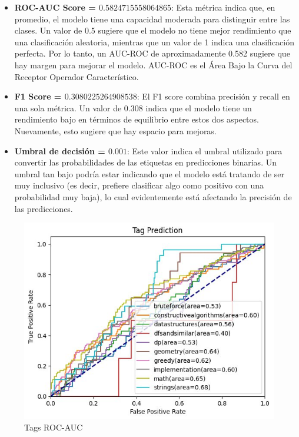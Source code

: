 \documentclass{article}
\begin{document}
    \begin{itemize}
        \item \textbf{ROC-AUC Score = $0.5824715558064865$}: Esta métrica indica que, en promedio, el modelo tiene una 
        capacidad moderada para distinguir entre las clases. Un valor de 0.5 sugiere que el modelo 
        no tiene mejor rendimiento que una clasificación aleatoria, mientras que un valor de 1 
        indica una clasificación perfecta. Por lo tanto, un AUC-ROC de aproximadamente 0.582 sugiere 
        que hay margen para mejorar el modelo. AUC-ROC  es el Área Bajo la Curva del Receptor Operador 
        Característico.
        \item \textbf{F1 Score = $0.3080225264908538$}: El F1 score combina precisión y recall en una 
        sola métrica. Un valor de 0.308 indica que el modelo tiene un rendimiento bajo en términos de 
        equilibrio entre estos dos aspectos. Nuevamente, esto sugiere que hay espacio para mejoras.
        \item \textbf{Umbral de decisión = $0.001$}: Este valor indica el umbral utilizado para convertir las 
        probabilidades de las etiquetas en predicciones binarias. Un umbral tan bajo podría estar 
        indicando que el modelo está tratando de ser muy inclusivo (es decir, prefiere clasificar 
        algo como positivo con una probabilidad muy baja), lo cual evidentemente está afectando la 
        precisión de las predicciones.
    \end{itemize}

    \begin{figure}[H]
        \centering
        \includegraphics[scale=0.55]{imgs/roc_auc.jpg}
        \caption{Tags ROC-AUC}
    \end{figure}
\end{document}
